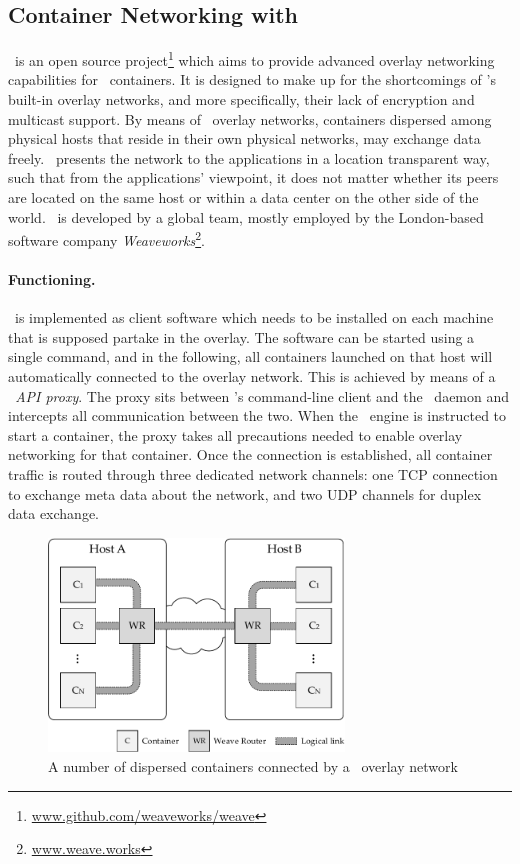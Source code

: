 
\subsection{Container Networking with \wnet}
\wnet\ is an open source project\footnote{\url{www.github.com/weaveworks/weave}} which aims to provide advanced overlay networking capabilities for \docker\ containers. It is designed to make up for the shortcomings of \docker 's built-in overlay networks, and more specifically, their lack of encryption and multicast support. By means of \docker\ overlay networks, containers dispersed among physical hosts that reside in their own physical networks, may exchange data freely. \wnet\ presents the network to the applications in a location transparent way, such that from the applications' viewpoint, it does not matter whether its peers are located on the same host or within a data center on the other side of the world. \wnet\ is developed by a global team, mostly employed by the London-based software company \emph{Weaveworks}\footnote{\url{www.weave.works}}.

\paragraph{Functioning.}
\wnet\ is implemented as client software which needs to be installed on each machine that is supposed partake in the overlay. The software can be started using a single command, and in the following, all containers launched on that host will automatically connected to the overlay network. This is achieved by means of a \emph{\docker\ API proxy}. The proxy sits between \docker 's command-line client and the \docker\ daemon and intercepts all communication between the two. When the \docker\ engine is instructed to start a container, the proxy takes all precautions needed to enable overlay networking for that container. Once the connection is established, all container traffic is routed through three dedicated network channels: one TCP connection to exchange meta data about the network, and two UDP channels for duplex data exchange.

\begin{figure}[htpb]
  \centering
  \includegraphics[width=0.7\textwidth]{figures/weave.pdf}
  \caption[An example of containers connected via \wnet\ overlay network]{A number of dispersed containers connected by a \wnet\ overlay network}\label{fig:weavescheme} 
\end{figure}

